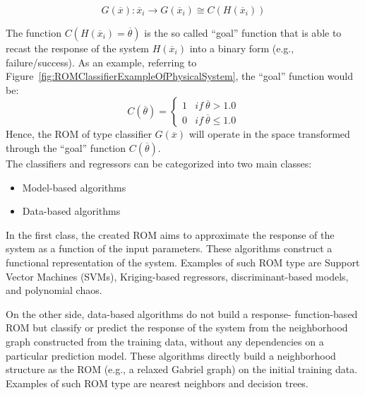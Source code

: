 \begin{equation}
\label{eq:classifier}
G\left ( \overline{x} \right ):\overline{x}_{i} \rightarrow G\left ( \overline{x}_{i} \right ) \cong 
C \left ( H\left ( \overline{x}_{i} \right ) \right )
\end{equation}

The function $C\left (  H\left ( \overline{x}_{i}  \right ) = \overline{\theta} 
\right ) $ is the so called ``goal'' function that is able to recast the 
response of the system $H\left ( \overline{x}_{i}  \right )$ into a binary 
form (e.g., failure/success). As an example, referring to 
Figure~\ref{fig:ROMClassifierExampleOfPhysicalSystem}, the 
``goal'' function would be:
\begin{equation}
\label{eq:goalFunctionClassifier}
C\left (   \overline{\theta}  \right ) = \left\{\begin{matrix}
1 & if \: \overline{\theta}>1.0 \\ 
0 &  if \: \overline{\theta} \leq 1.0
\end{matrix}\right.
\end{equation}
Hence, the ROM of type classifier $G\left (  \overline{x} \right )$  will operate in the space transformed through the ``goal''  function $C\left (   \overline{\theta}  \right )$. 
\\The classifiers and regressors can be categorized into two main classes:
\begin{itemize}
  \item Model-based algorithms
  \item Data-based algorithms
\end{itemize}
In the first class, the created ROM aims to approximate the response 
of the system as a function of the input parameters. These algorithms 
construct a functional representation of the system. Examples of such ROM type are Support Vector Machines (SVMs), Kriging-based regressors, discriminant-based models, and polynomial chaos.

On the other side, data-based algorithms do not build a response-
function-based ROM but classify or predict the response of the 
system from the neighborhood graph constructed from the training 
data, without any dependencies on a particular prediction model.
These algorithms directly build a neighborhood structure as the 
ROM (e.g., a relaxed Gabriel graph) on the initial training data. Examples of such ROM type are nearest neighbors and decision trees.

